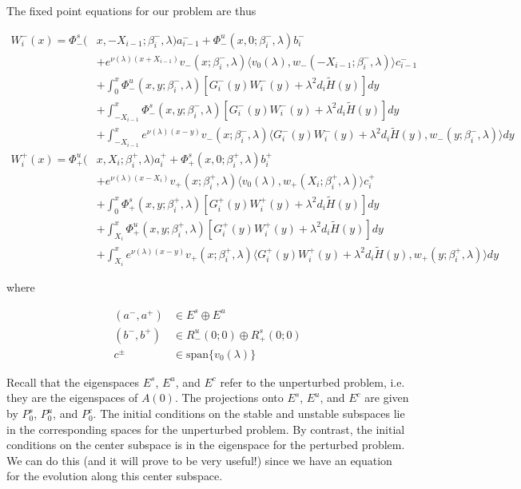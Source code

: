 \documentclass[12pt]{article}
\begin{document}
The fixed point equations for our problem are thus

\begin{align*}
W_i^-(x) = \Phi^s_-(&x, -X_{i-1}; \beta_i^-, \lambda) a_{i-1}^- + \Phi^u_-(x, 0; \beta_i^-, \lambda) b_i^- \\
&+ e^{\nu(\lambda)(x+X_{i-1})} v_-(x; \beta_i^-, \lambda) \langle v_0(\lambda), w_-(-X_{i-1}; \beta_i^-, \lambda) \rangle c_{i-1}^- \\
&+ \int_0^x \Phi^u_-(x, y; \beta_i^-, \lambda)[ G_i^-(y)W_i^-(y) + \lambda^2 d_i \tilde{H}(y) ] dy \\
&+ \int_{-X_{i-1}}^x \Phi^s_-(x, y; \beta_i^-, \lambda) [ G_i^-(y)W_i^-(y) + \lambda^2 d_i \tilde{H}(y) ] dy \\
&+ \int_{-X_{i-1}}^x 
e^{\nu(\lambda)(x-y)} v_-(x; \beta_i^-, \lambda) \langle G_i^-(y)W_i^-(y) + \lambda^2 d_i \tilde{H}(y), w_-(y; \beta_i^-, \lambda) \rangle dy \\
W_i^+(x) = \Phi^u_+(&x, X_i; \beta_i^+, \lambda)a_i^+ + \Phi^s_+(x, 0; \beta_i^+, \lambda)b_i^+ \\
&+ e^{\nu(\lambda)(x - X_i)} v_+(x; \beta_i^+, \lambda) \langle v_0(\lambda), w_+(X_i; \beta_i^+, \lambda) \rangle c_i^+ \\
&+ \int_0^x \Phi^s_+(x, y; \beta_i^+, \lambda) [ G_i^+(y)W_i^+(y) + \lambda^2 d_i \tilde{H}(y) ] dy \\
&+ \int_{X_i}^x \Phi^u_+(x, y; \beta_i^+, \lambda) [ G_i^+(y)W_i^+(y) + \lambda^2 d_i \tilde{H}(y) ] dy \\
&+ \int_{X_i}^x e^{\nu(\lambda)(x-y)} v_+(x; \beta_i^+, \lambda) \langle G_i^+(y)W_i^+(y) + \lambda^2 d_i \tilde{H}(y), w_+(y; \beta_i^+, \lambda) \rangle dy
\end{align*}

where

\begin{align*}
(a^-, a^+) &\in E^s \oplus E^u\\
(b^-, b^+) &\in R^u_-(0; 0) \oplus R^s_+(0; 0)\\
c^\pm &\in \text{span}\{v_0(\lambda)\}
\end{align*}

Recall that the eigenspaces $E^s$, $E^u$, and $E^c$ refer to the unperturbed problem, i.e. they are the eigenspaces of $A(0)$. The projections onto $E^s$, $E^u$, and $E^c$ are given by $P_0^s$, $P_0^u$, and $P_0^c$. The initial conditions on the stable and unstable subspaces lie in the corresponding spaces for the unperturbed problem. By contrast, the initial conditions on the center subspace is in the eigenspace for the perturbed problem. We can do this (and it will prove to be very useful!) since we have an equation for the evolution along this center subspace.\\
\end{document}
